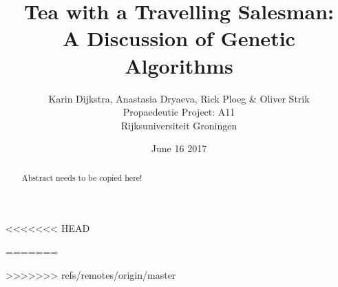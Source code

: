 \documentclass[11pt,a4paper]{report}
\title{Tea with a Travelling Salesman:\\
	\large A Discussion of Genetic Algorithms}
\author{Karin Dijkstra, Anastasia Dryaeva, Rick Ploeg \& Oliver Strik\\
Propaedeutic Project: A11\\
Rijksuniversiteit Groningen}
\date{June 16 2017}
\begin{document}
\maketitle

\begin{abstract}
Abstract needs to be copied here!
\end{abstract}

\tableofcontents


<<<<<<< HEAD

%
=======


>>>>>>> refs/remotes/origin/master


%


\end{document}
